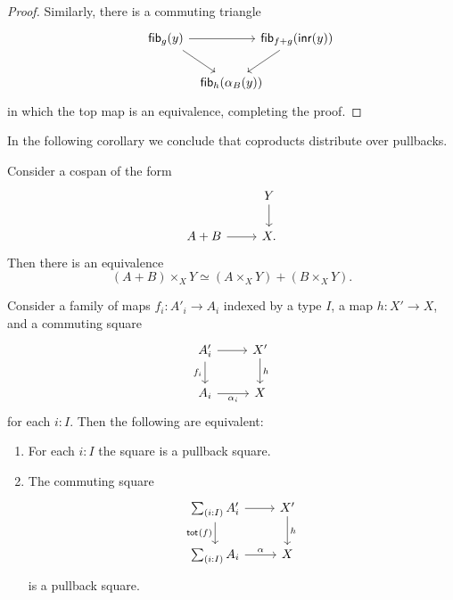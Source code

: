 \begin{proof}
Similarly, there is a commuting triangle
\begin{equation*}
\begin{tikzcd}[column sep=-1em]
\fib{g}{y} \arrow[rr] \arrow[dr] & & \fib{f+g}{\inr(y)} \arrow[dl] \\
\phantom{\fib{f+g}{\inr(y)}} & \fib{h}{\alpha_B(y)}
\end{tikzcd}
\end{equation*}
in which the top map is an equivalence, completing the proof.
\end{proof}

In the following corollary we conclude that coproducts distribute over pullbacks. 

\begin{cor}
Consider a cospan of the form
\begin{equation*}
\begin{tikzcd}
& Y \arrow[d] \\
A+B \arrow[r] & X.
\end{tikzcd}
\end{equation*}
Then there is an equivalence
\begin{equation*}
(A+B)\times_X Y \simeq (A\times_X Y)+(B\times_X Y).
\end{equation*}
\end{cor}

\begin{thm}\label{thm:descent-Sigma}
Consider a family of maps $f_i:A'_i\to A_i$ indexed by a type $I$, a map $h:X'\to X$, and a commuting square
\begin{equation*}
\begin{tikzcd}
A'_i \arrow[r] \arrow[d,swap,"f_i"] & X' \arrow[d,"h"] \\
A_i \arrow[r,swap,"\alpha_i"] & X
\end{tikzcd}
\end{equation*}
for each $i:I$. Then the following are equivalent:
\begin{enumerate}
\item For each $i:I$ the square is a pullback square.
\item The commuting square
\begin{equation*}
\begin{tikzcd}
\sm{i:I}A'_i \arrow[d,swap,"\total{f}"] \arrow[r] & X' \arrow[d,"h"] \\
\sm{i:I}A_i \arrow[r,"\alpha"] & X
\end{tikzcd}
\end{equation*}
is a pullback square.
\end{enumerate}
\end{thm}

